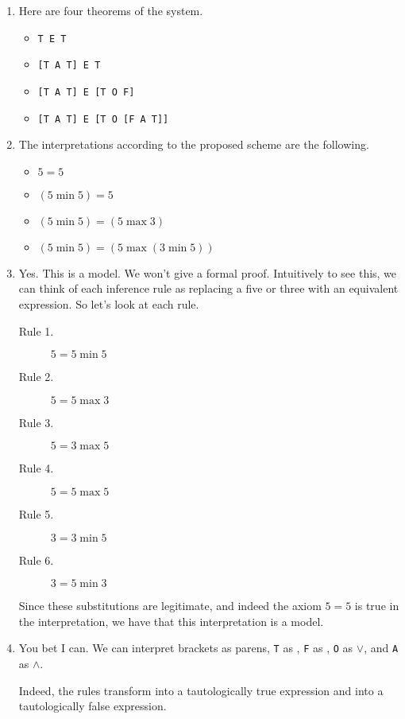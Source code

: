\documentclass[11pt,letterpaper]{article}
\begin{document}
\begin{enumerate}
  \item
    Here are four theorems of the system.
    \begin{itemize}
      \item
        \texttt{T E T}
      \item
        \texttt{[T A T] E T}
      \item
        \texttt{[T A T] E [T O F]}
      \item
        \texttt{[T A T] E [T O [F A T]]}
    \end{itemize}

  \item
    The interpretations according to the proposed scheme are the following.
    \begin{itemize}
      \item
        $5 = 5$
      \item
        $(5 \min 5) = 5$
      \item
        $(5 \min 5) = (5 \max 3)$
      \item
        $(5 \min 5) = (5 \max (3 \min 5))$
    \end{itemize}

  \item
    Yes. This is a model.
    We won't give a formal proof.
    Intuitively to see this, we can think of each inference rule as replacing
    a five or three with an equivalent expression. So let's look at each rule.
    \begin{description}
      \item[Rule 1.] $5 = 5 \min 5$
      \item[Rule 2.] $5 = 5 \max 3$
      \item[Rule 3.] $5 = 3 \max 5$
      \item[Rule 4.] $5 = 5 \max 5$
      \item[Rule 5.] $3 = 3 \min 5$
      \item[Rule 6.] $3 = 5 \min 3$
    \end{description}

    Since these substitutions are legitimate, and indeed the axiom $5 = 5$ is
    true in the interpretation, we have that this interpretation is a model.

  \item
    You bet I can.
    We can interpret brackets as parens, \texttt{T} as ,
    \texttt{F} as , \texttt{O} as $\lor$, and \texttt{A} as
    $\land$.

    Indeed, the rules transform  into a tautologically true
    expression and  into a tautologically false expression.
\end{enumerate}
\end{document}

